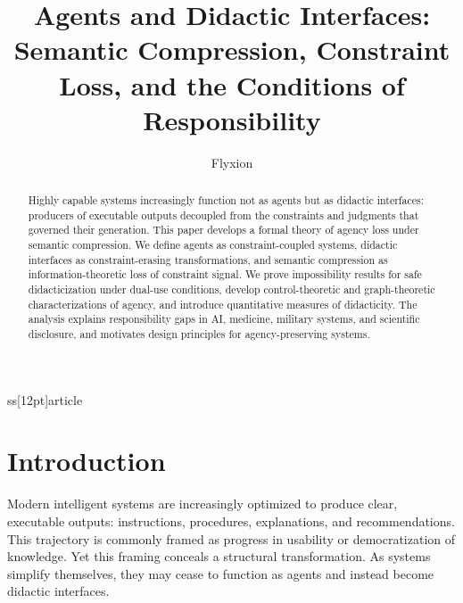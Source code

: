 ss[12pt]{article}

\usepackage[T1]{fontenc}
\usepackage[utf8]{inputenc}
\usepackage{lmodern}
\usepackage{amsmath,amssymb,amsthm}
\usepackage{geometry}
\usepackage{setspace}
\usepackage{hyperref}

\geometry{margin=1in}

\newtheorem{definition}{Definition}
\newtheorem{theorem}{Theorem}
\newtheorem{proposition}{Proposition}
\newtheorem{corollary}{Corollary}

\title{\textbf{Agents and Didactic Interfaces:\\
Semantic Compression, Constraint Loss, and the Conditions of Responsibility}}
\author{Flyxion}
\date{}


\maketitle

\begin{abstract}
Highly capable systems increasingly function not as agents but as didactic interfaces: producers of executable outputs decoupled from the constraints and judgments that governed their generation. This paper develops a formal theory of agency loss under semantic compression. We define agents as constraint-coupled systems, didactic interfaces as constraint-erasing transformations, and semantic compression as information-theoretic loss of constraint signal. We prove impossibility results for safe didacticization under dual-use conditions, develop control-theoretic and graph-theoretic characterizations of agency, and introduce quantitative measures of didacticity. The analysis explains responsibility gaps in AI, medicine, military systems, and scientific disclosure, and motivates design principles for agency-preserving systems.
\end{abstract}

\section{Introduction}

Modern intelligent systems are increasingly optimized to produce clear, executable outputs: instructions, procedures, explanations, and recommendations. This trajectory is commonly framed as progress in usability or democratization of knowledge. Yet this framing conceals a structural transformation. As systems simplify themselves, they may cease to function as agents and instead become didactic interfaces.

